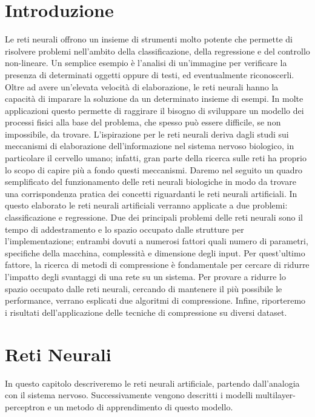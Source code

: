 \documentclass[11pt,a4paper,twoside,
openright]{book}
\begin{document}
\tableofcontents

\chapter*{Introduzione}
Le reti neurali offrono un insieme di strumenti molto potente che permette di risolvere problemi nell'ambito della classificazione, della regressione e del
controllo non-lineare. Un semplice esempio è l'analisi di un'immagine per verificare la presenza di determinati oggetti oppure di testi, ed eventualmente
riconoscerli.
Oltre ad avere un'elevata velocità di elaborazione, le reti neurali hanno la capacità di imparare la soluzione da un determinato insieme di esempi. In molte applicazioni questo permette di raggirare il bisogno di sviluppare un modello dei processi fisici alla base del problema, che spesso può essere difficile, se non impossibile, da trovare.
L'ispirazione per le reti neurali deriva dagli studi sui meccanismi di elaborazione dell'informazione nel sistema nervoso biologico, in particolare il cervello umano; infatti, gran parte della ricerca sulle reti ha proprio lo scopo di capire più a fondo questi meccanismi. Daremo nel seguito un quadro semplificato del funzionamento delle reti neurali biologiche in modo da trovare una corrispondenza pratica dei concetti riguardanti le reti neurali artificiali.
In questo elaborato le reti neurali artificiali verranno applicate a due problemi: classificazione e regressione.
Due dei principali problemi delle reti neurali sono il tempo di addestramento e lo spazio occupato dalle strutture per l'implementazione; entrambi dovuti a numerosi fattori quali numero di parametri, specifiche della macchina, complessità e dimensione degli input. Per quest'ultimo fattore, la ricerca di metodi di compressione è fondamentale per cercare di ridurre l'impatto degli svantaggi di una rete su un sistema. 
Per provare a ridurre lo spazio occupato dalle reti neurali, cercando di mantenere il più possibile le performance, verrano esplicati due algoritmi di compressione. Infine, riporteremo i risultati dell'applicazione delle tecniche di compressione su diversi dataset.
\chapter{Reti Neurali}
In questo capitolo descriveremo le reti neurali artificiale, partendo dall'analogia con il sistema nervoso. Successivamente vengono descritti i modelli multilayer-perceptron e un metodo di apprendimento di questo modello.
\end{document}
